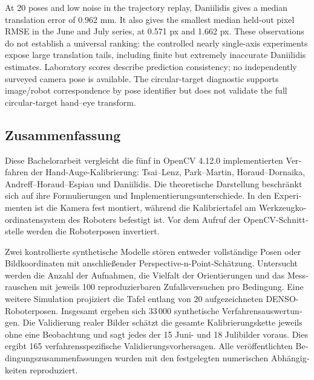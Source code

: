 \documentclass[12pt,a4paper]{article}
\begin{document}
At 20 poses and low noise in the trajectory replay, Daniilidis gives a median translation error of 0.962 mm. It also gives the smallest median held-out pixel RMSE in the June and July series, at 0.571 px and 1.662 px. These observations do not establish a universal ranking: the controlled nearly single-axis experiments expose large translation tails, including finite but extremely inaccurate Daniilidis estimates. Laboratory scores describe prediction consistency; no independently surveyed camera pose is available. The circular-target diagnostic supports image/robot correspondence by pose identifier but does not validate the full circular-target hand--eye transform. \cite{experimentcode,eauncertainty}

\clearpage
\begin{otherlanguage}{ngerman}
\section*{Zusammenfassung}
Diese Bachelorarbeit vergleicht die f\"unf in OpenCV 4.12.0 implementierten Verfahren der Hand-Auge-Kalibrierung: Tsai--Lenz, Park--Martin, Horaud--Dornaika, Andreff--Horaud--Espiau und Daniilidis. Die theoretische Darstellung beschr\"ankt sich auf ihre Formulierungen und Implementierungsunterschiede. In den Experimenten ist die Kamera fest montiert, w\"ahrend die Kalibriertafel am Werkzeugkoordinatensystem des Roboters befestigt ist. Vor dem Aufruf der OpenCV-Schnittstelle werden die Roboterposen invertiert. \cite{opencv,opencvsource}

Zwei kontrollierte synthetische Modelle st\"oren entweder vollst\"andige Posen oder Bildkoordinaten mit anschlie\ss ender Perspective-n-Point-Sch\"atzung. Untersucht werden die Anzahl der Aufnahmen, die Vielfalt der Orientierungen und das Messrauschen mit jeweils 100 reproduzierbaren Zufallsversuchen pro Bedingung. Eine weitere Simulation projiziert die Tafel entlang von 20 aufgezeichneten DENSO-Roboterposen. Insgesamt ergeben sich 33\,000 synthetische Verfahrensauswertungen. Die Validierung realer Bilder sch\"atzt die gesamte Kalibrierungskette jeweils ohne eine Beobachtung und sagt jedes der 15 Juni- und 18 Julibilder voraus. Dies ergibt 165 verfahrensspezifische Validierungsvorhersagen. Alle ver\"offentlichten Bedingungszusammenfassungen wurden mit den festgelegten numerischen Abh\"angigkeiten reproduziert. \cite{experimentcode}


\end{otherlanguage}
\end{document}
